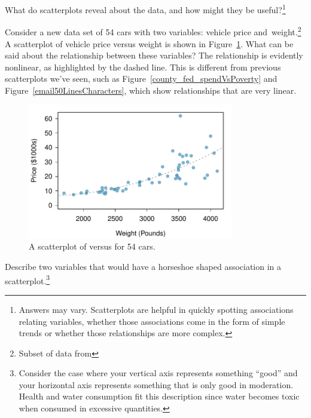 \begin{exercise}
What do scatterplots reveal about the data, and how might they be useful?\footnote{Answers may vary. Scatterplots are helpful in quickly spotting associations relating variables, whether those associations come in the form of simple trends or whether those relationships are more complex.}
\end{exercise}

\begin{example}{Consider a new data set of 54 cars with two variables: vehicle price and~weight.\footnote{Subset of data from } A scatterplot of vehicle price versus weight is shown in Figure~\ref{carsPriceVsWeight}. What can be said about the relationship between these variables?}
The relationship is evidently nonlinear, as highlighted by the dashed line. This is different from previous scatterplots we've seen, such as Figure~\vref{county_fed_spendVsPoverty} and Figure~\ref{email50LinesCharacters}, which show relationships that are very linear.

\begin{figure}[h]
   \centering
   \includegraphics[width=0.8\textwidth]{ch_intro_to_data/figures/carsPriceVsWeight/carsPriceVsWeight}
   \caption{A scatterplot of  versus  for 54 cars.}
   \label{carsPriceVsWeight}
\end{figure}
\end{example}

\begin{exercise}
Describe two variables that would have a horseshoe shaped association in a scatterplot.\footnote{Consider the case where your vertical axis represents something ``good'' and your horizontal axis represents something that is only good in moderation. Health and water consumption fit this description since water becomes toxic when consumed in excessive quantities.}
\end{exercise}

